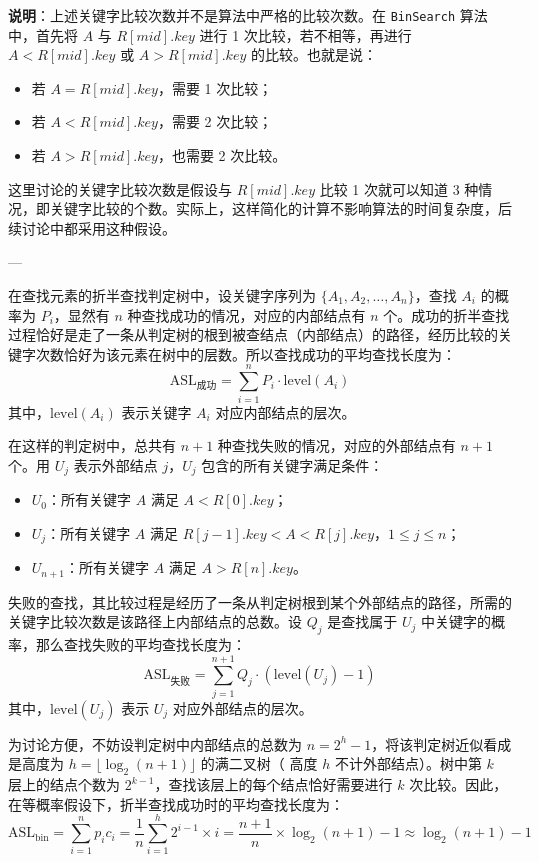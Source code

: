 \documentclass[lang=cn,newtx,10pt,scheme=chinese]{elegantbook}
\begin{document}
\textbf{说明}：上述关键字比较次数并不是算法中严格的比较次数。在 \texttt{BinSearch} 算法中，首先将 $A$ 与 $R[mid].key$ 进行 1 次比较，若不相等，再进行 $A < R[mid].key$ 或 $A > R[mid].key$ 的比较。也就是说：
\begin{itemize}
  \item 若 $A = R[mid].key$，需要 1 次比较；
  \item 若 $A < R[mid].key$，需要 2 次比较；
  \item 若 $A > R[mid].key$，也需要 2 次比较。
\end{itemize}
这里讨论的关键字比较次数是假设与 $R[mid].key$ 比较 1 次就可以知道 3 种情况，即关键字比较的个数。实际上，这样简化的计算不影响算法的时间复杂度，后续讨论中都采用这种假设。

---

在查找元素的折半查找判定树中，设关键字序列为 $\{A_1, A_2, \dots, A_n\}$，查找 $A_i$ 的概率为 $P_i$，显然有 $n$ 种查找成功的情况，对应的内部结点有 $n$ 个。成功的折半查找过程恰好是走了一条从判定树的根到被查结点（内部结点）的路径，经历比较的关键字次数恰好为该元素在树中的层数。所以查找成功的平均查找长度为：
\[
\text{ASL}_{\text{成功}} = \sum_{i=1}^n P_i \cdot \text{level}(A_i)
\]
其中，$\text{level}(A_i)$ 表示关键字 $A_i$ 对应内部结点的层次。

在这样的判定树中，总共有 $n+1$ 种查找失败的情况，对应的外部结点有 $n+1$ 个。用 $U_j$ 表示外部结点 $j$，$U_j$ 包含的所有关键字满足条件：
\begin{itemize}
  \item $U_0$：所有关键字 $A$ 满足 $A < R[0].key$；
  \item $U_j$：所有关键字 $A$ 满足 $R[j-1].key < A < R[j].key$，$1 \leq j \leq n$；
  \item $U_{n+1}$：所有关键字 $A$ 满足 $A > R[n].key$。
\end{itemize}

失败的查找，其比较过程是经历了一条从判定树根到某个外部结点的路径，所需的关键字比较次数是该路径上内部结点的总数。设 $Q_j$ 是查找属于 $U_j$ 中关键字的概率，那么查找失败的平均查找长度为：
\[
\text{ASL}_{\text{失败}} = \sum_{j=1}^{n+1} Q_j \cdot (\text{level}(U_j) - 1)
\]
其中，$\text{level}(U_j)$ 表示 $U_j$ 对应外部结点的层次。


为讨论方便，不妨设判定树中内部结点的总数为 $n = 2^h - 1$，将该判定树近似看成是高度为 $h = \lfloor \log_2 (n+1) \rfloor$ 的满二叉树（
高度 $h$ 不计外部结点）。树中第 $k$ 层上的结点个数为 $2^{k-1}$，查找该层上的每个结点恰好需要进行 $k$ 次比较。因此，在等概率假设下，折半查找成功时的平均查找长度为：
\[
\text{ASL}_{\text{bin}} = \sum_{i=1}^{n} p_i c_i = \frac{1}{n} \sum_{i=1}^{h} 2^{i-1} \times i = \frac{n+1}{n} \times \log_2 (n+1) -1 \approx \log_2 (n+1) -1
\]
\end{document}

